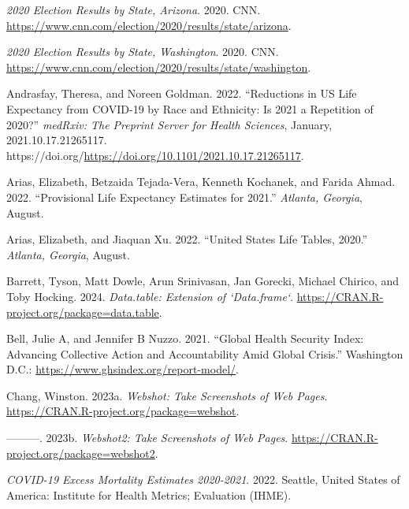 \documentclass[
  letterpaper,
  DIV=11,
  numbers=noendperiod]{scrartcl}
\newlength{\cslhangindent}
\newlength{\cslentryspacingunit} %
\newenvironment{CSLReferences}[2] %
 {%
  \setlength{\parindent}{0pt}
  \ifodd #1
  \let\oldpar\par
  \def\par{\hangindent=\cslhangindent\oldpar}
  \fi
  \setlength{\parskip}{#2\cslentryspacingunit}
 }%
 {}
\begin{document}
\hypertarget{refs}{}
\begin{CSLReferences}{1}{0}
\leavevmode{}%
\emph{2020 Election Results by State, Arizona}. 2020. CNN.
\url{https://www.cnn.com/election/2020/results/state/arizona}.

\leavevmode{}%
\emph{2020 Election Results by State, Washington}. 2020. CNN.
\url{https://www.cnn.com/election/2020/results/state/washington}.

\leavevmode{}%
Andrasfay, Theresa, and Noreen Goldman. 2022. {``Reductions in US Life
Expectancy from COVID-19 by Race and Ethnicity: Is 2021 a Repetition of
2020?''} \emph{medRxiv: The Preprint Server for Health Sciences},
January, 2021.10.17.21265117.
https://doi.org/\url{https://doi.org/10.1101/2021.10.17.21265117}.

\leavevmode{}%
Arias, Elizabeth, Betzaida Tejada-Vera, Kenneth Kochanek, and Farida
Ahmad. 2022. {``Provisional Life Expectancy Estimates for 2021.''}
\emph{Atlanta, Georgia}, August.

\leavevmode{}%
Arias, Elizabeth, and Jiaquan Xu. 2022. {``United States Life Tables,
2020.''} \emph{Atlanta, Georgia}, August.

\leavevmode{}%
Barrett, Tyson, Matt Dowle, Arun Srinivasan, Jan Gorecki, Michael
Chirico, and Toby Hocking. 2024. \emph{Data.table: Extension of
`Data.frame`}. \url{https://CRAN.R-project.org/package=data.table}.

\leavevmode{}%
Bell, Julie A, and Jennifer B Nuzzo. 2021. {``Global Health Security
Index: Advancing Collective Action and Accountability Amid Global
Crisis.''} Washington D.C.:
\url{https://www.ghsindex.org/report-model/}.

\leavevmode{}%
Chang, Winston. 2023a. \emph{Webshot: Take Screenshots of Web Pages}.
\url{https://CRAN.R-project.org/package=webshot}.

\leavevmode{}%
---------. 2023b. \emph{Webshot2: Take Screenshots of Web Pages}.
\url{https://CRAN.R-project.org/package=webshot2}.

\leavevmode{}%
\emph{COVID-19 Excess Mortality Estimates 2020-2021}. 2022. Seattle,
United States of America: Institute for Health Metrics; Evaluation
(IHME).


\end{CSLReferences}
\end{document}
